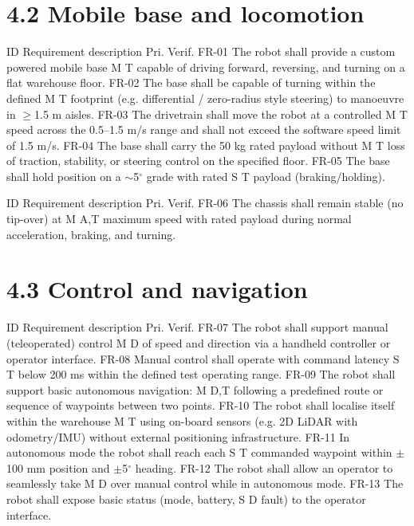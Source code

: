 \section*{4.2 Mobile base and locomotion}

ID          Requirement description                                         Pri.         Verif. FR-01       The robot shall provide a custom powered mobile base             M             T capable of driving forward, reversing, and turning on a flat warehouse floor. FR-02       The base shall be capable of turning within the defined          M             T footprint (e.g. differential / zero-radius style steering) to manoeuvre in $\geq$1.5 m aisles. FR-03       The drivetrain shall move the robot at a controlled              M             T speed across the 0.5--1.5 m/s range and shall not exceed the software speed limit of 1.5 m/s. FR-04       The base shall carry the 50 kg rated payload without             M             T loss of traction, stability, or steering control on the specified floor. FR-05       The base shall hold position on a $\sim$5$^\circ$ grade with rated           S             T payload (braking/holding).

ID          Requirement description                                    Pri.         Verif. FR-06       The chassis shall remain stable (no tip-over) at           M             A,T maximum speed with rated payload during normal acceleration, braking, and turning.

\section*{4.3 Control and navigation}

ID          Requirement description                                    Pri.         Verif. FR-07       The robot shall support manual (teleoperated) control      M              D of speed and direction via a handheld controller or operator interface. FR-08       Manual control shall operate with command latency           S             T below 200 ms within the defined test operating range. FR-09       The robot shall support basic autonomous navigation:       M             D,T following a predefined route or sequence of waypoints between two points. FR-10       The robot shall localise itself within the warehouse       M              T using on-board sensors (e.g. 2D LiDAR with odometry/IMU) without external positioning infrastructure. FR-11       In autonomous mode the robot shall reach each               S             T commanded waypoint within $\pm$100 mm position and $\pm$5$^\circ$ heading. FR-12       The robot shall allow an operator to seamlessly take       M              D over manual control while in autonomous mode. FR-13       The robot shall expose basic status (mode, battery,         S             D fault) to the operator interface.

